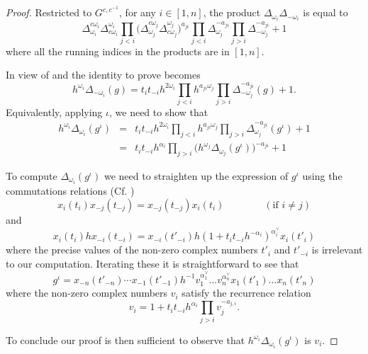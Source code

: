 \documentclass[12pt]{amsart}
\theoremstyle{remark}
\numberwithin{equation}{section}
\begin{document}
\begin{proof}
  Restricted to $G^{c,c^{-1}}$, for any $i\in[1,n]$, the product $\Delta_{\omega_i}\Delta_{-\omega_i}$ is equal to
  \begin{equation} 
    \Delta^{c \omega_i}_{\omega_i}
    \Delta^{\omega_i}_{ c\omega_i} 
    \prod_{j<i}\big(
      \Delta^{c \omega_j}_{\omega_j} 
      \Delta^{\omega_j}_{c \omega_j}
    \big)^{a_{j i}}
    \prod_{j<i}\Delta_{\omega_j}^{-a_{ji}}
    \prod_{j>i}\Delta_{-\omega_j}^{-a_{ji}}
    +1
  \end{equation}
  where all the running indices in the products are in $[1,n]$.

  In view of  and  the identity to prove becomes
  \[
    h^{\omega_i}\Delta_{-\omega_i}(g)
    =
    t_i
    t_{-i}
    h^{2\omega_i}
    \prod_{j<i}h^{a_{j i}\omega_j}
    \prod_{j>i}\Delta_{-\omega_j}^{-a_{ji}}(g)
    +
    1.
  \]
  Equivalently, applying $\iota$, we need to show that 
  \begin{eqnarray*}
    h^{\omega_i}\Delta_{\omega_i}(g^\iota)
    & = &
    t_i
    t_{-i}
    h^{2\omega_i}
    \prod_{j<i}h^{a_{ji}\omega_j}
    \prod_{j>i}\Delta_{\omega_j}^{-a_{ji}}(g^\iota)
    +
    1\\
    & = &
    t_i
    t_{-i}
    h^{\alpha_i}
    \prod_{j>i}\Big(h^{\omega_j}\Delta_{\omega_j}(g^\iota)\Big)^{-a_{ji}}
    +
    1
  \end{eqnarray*}

  To compute $\Delta_{\omega_i}(g^\iota)$ we need to straighten up the expression of $g^\iota$ using the commutations relations (Cf. \cite[Proposition 7.2]{BZ01})
  \begin{equation}
    x_i(t_i)x_{-j}(t_{-j}) 
    =
    x_{-j}(t_{-j})x_i(t_i) 
    \qquad
    \qquad
    (\text{if $i\neq j$})
  \end{equation}
  and
  \begin{equation}
    x_i(t_i) h x_{-i}(t_{-i})
    =
    x_{-i}(t'_{-i})
    h
    (1+t_it_{-i}h^{-\alpha_i})^{\alpha_i^\vee}
    x_{i}(t'_i)
  \end{equation}
  where the precise values of the non-zero complex numbers $t'_i$ and $t'_{-i}$ is irrelevant to our computation.
  Iterating these it is straightforward to see that
  \[
    g^\iota 
    = 
    x_{-n}(t'_{-n})
    \cdots
    x_{-1}(t'_{-1})
    h^{-1}
    v_1^{\alpha^\vee_1}
    \dots
    v_n^{\alpha^\vee_n}
    x_1(t'_1)
    \dots
    x_n(t'_n)
  \]
  where the non-zero complex numbers $v_i$ satisfy the recurrence relation
  \[
    v_i 
    = 
    1 + t_i t_{-i} h^{\alpha_i}
    \prod_{j > i} v_j^{-a_{j,i}}.
  \]

  To conclude our proof is then sufficient to observe that $h^{\omega_i}\Delta_{\omega_i}(g^\iota)$ is $v_i$.

\end{proof}
\end{document}
